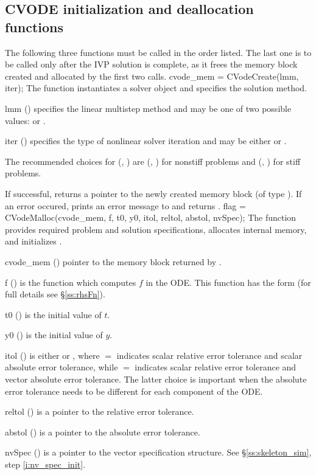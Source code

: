 \subsection{CVODE initialization and deallocation functions}
\label{sss:cvodemalloc}
The following three functions must be called in the order listed. The last one is to be 
called only after the IVP solution is complete, as it frees the {\cvode} memory block
created and allocated by the first two calls.
{
  cvode\_mem = CVodeCreate(lmm, iter);
}
{
  The function  instantiates a {\cvode} solver object and specifies 
  the solution method.
}
{
  \begin{args}[iter]
  \item[lmm] ()
    specifies the linear multistep method and may be one of two
    possible values:  or .     
  \item[iter] ()
    specifies the type of nonlinear solver iteration and may be
    either  or . 
  \end{args}
  The recommended choices for (, ) are
  (, ) for nonstiff problems and
  (, ) for stiff problems.
}
{
  If successful,  returns a pointer to the newly created 
  {\cvode} memory block (of type ).
  If an error occured,  prints an error message to 
  and returns .
}
{}
{
flag = CVodeMalloc(cvode\_mem, f, t0, y0, itol, reltol, abstol, nvSpec);
}
{
  The function  provides required problem and solution specifications, 
  allocates internal memory, and initializes {\cvode}.
}
{
  \begin{args}
  \item[cvode\_mem] ()
    pointer to the {\cvode} memory block returned by .
  \item[f] ()
    is the {\C} function which computes $f$ in the ODE. This function has the form 
     (for full details see \S\ref{ss:rhsFn}).
  \item[t0] ()
    is the initial value of $t$.
  \item[y0] ()
    is the initial value of $y$. 
  \item[itol] () 
    is either  or , where $=$ indicates scalar relative error 
    tolerance and scalar absolute error tolerance, while $=$ indicates scalar
    relative error tolerance and vector absolute error tolerance. 
    The latter choice is important when the absolute error tolerance needs to
    be different for each component of the ODE. 
  \item[reltol] ()
    is a pointer to the relative error tolerance.
  \item[abstol] ()
    is a pointer to the absolute error tolerance.
  \item[nvSpec] ()
    is a pointer to the vector specification structure. See \S\ref{ss:skeleton_sim}, 
    step \ref{i:nv_spec_init}.
  \end{args}
}
